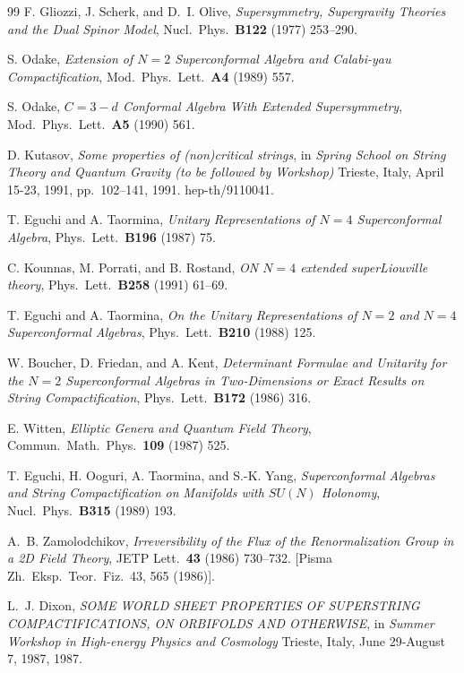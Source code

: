\begin{thebibliography}{99}
 F. Gliozzi, J. Scherk, and D.~I. Olive, \emph{Supersymmetry, Supergravity Theories and the Dual Spinor Model}, Nucl.\ Phys.\ \textbf{B122} (1977) 253--290.

 S. Odake, \emph{Extension of $N=2$ Superconformal Algebra and Calabi-yau Compactification}, Mod.\ Phys.\ Lett.\ \textbf{A4} (1989) 557.

 S. Odake, \emph{$C=3-d$ Conformal Algebra With Extended Supersymmetry}, Mod.\ Phys.\ Lett.\ \textbf{A5} (1990) 561.

 D. Kutasov, \emph{Some properties of (non)critical strings}, in \emph{Spring School on String Theory and Quantum Gravity (to be followed by Workshop)} Trieste, Italy, April 15-23, 1991, pp.~102--141, 1991. hep-th/9110041.

 T. Eguchi and A. Taormina, \emph{Unitary Representations of $N=4$ Superconformal Algebra}, Phys.\ Lett.\ \textbf{B196} (1987) 75.

 C. Kounnas, M. Porrati, and B. Rostand, \emph{ON $N=4$ extended superLiouville theory}, Phys.\ Lett.\ \textbf{B258} (1991) 61--69.

 T. Eguchi and A. Taormina, \emph{On the Unitary Representations of $N=2$ and $N=4$ Superconformal Algebras}, Phys.\ Lett.\ \textbf{B210} (1988) 125.

 W. Boucher, D. Friedan, and A. Kent, \emph{Determinant Formulae and Unitarity for the $N=2$ Superconformal Algebras in Two-Dimensions or Exact Results on String Compactification}, Phys.\ Lett.\ \textbf{B172} (1986) 316.

 E. Witten, \emph{Elliptic Genera and Quantum Field Theory}, Commun.\ Math.\ Phys.\ \textbf{109} (1987) 525.

 T. Eguchi, H. Ooguri, A. Taormina, and S.-K. Yang, \emph{Superconformal Algebras and String Compactification on Manifolds with $SU(N)$ Holonomy}, Nucl.\ Phys.\ \textbf{B315} (1989) 193.

 A.~B. Zamolodchikov, \emph{Irreversibility of the Flux of the Renormalization Group in a 2D Field Theory}, JETP Lett.\ \textbf{43} (1986) 730--732. [Pisma Zh.\ Eksp.\ Teor.\ Fiz.\ 43, 565 (1986)].

 L.~J. Dixon, \emph{SOME WORLD SHEET PROPERTIES OF SUPERSTRING COMPACTIFICATIONS, ON ORBIFOLDS AND OTHERWISE}, in \emph{Summer Workshop in High-energy Physics and Cosmology} Trieste, Italy, June 29-August 7, 1987, 1987.


\end{thebibliography}
